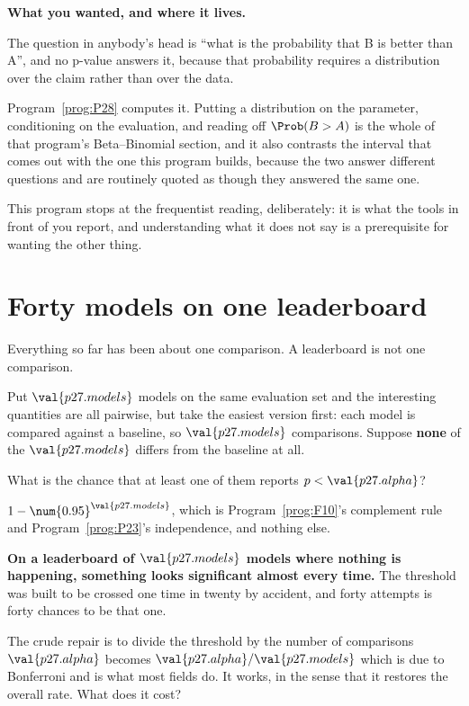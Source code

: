 \begin{fr}
\begin{rigourbox}
\textbf{What you wanted, and where it lives.}

The question in anybody's head is \enquote{what is the probability that B is
better than A}, and no p-value answers it, because that probability requires
a distribution over the claim rather than over the data.

Program~\ref{prog:P28} computes it. Putting a distribution on the parameter,
conditioning on the evaluation, and reading off $\Prob(B > A)$ is the whole
of that program's Beta--Binomial section, and it also contrasts the interval
that comes out with the one this program builds, because the two answer
different questions and are routinely quoted as though they answered the
same one.

This program stops at the frequentist reading, deliberately: it is what the
tools in front of you report, and understanding what it does not say is a
prerequisite for wanting the other thing.
\end{rigourbox}
\end{fr}

\section{Forty models on one leaderboard}
\label{sec:P27-many}

\begin{fr}
Everything so far has been about one comparison. A leaderboard is not one
comparison.

Put $\val{p27.models}$ models on the same evaluation set and the interesting
quantities are all pairwise, but take the easiest version first: each model
is compared against a baseline, so $\val{p27.models}$ comparisons. Suppose
\textbf{none} of the $\val{p27.models}$ differs from the baseline at all.

What is the chance that at least one of them reports
$p < \val{p27.alpha}$?
\dotline
\nextframe
\end{fr}

\begin{fr}

$1 - \num{0.95}^{\val{p27.models}}$, which is Program~\ref{prog:F10}'s
complement rule and Program~\ref{prog:P23}'s independence, and nothing else.

\textbf{On a leaderboard of $\val{p27.models}$ models where nothing is
happening, something looks significant almost every time.} The threshold was
built to be crossed one time in twenty by accident, and forty attempts is
forty chances to be that one.

The crude repair is to divide the threshold by the number of comparisons
\dash{} $\val{p27.alpha}$ becomes $\val{p27.alpha}/\val{p27.models}$ \dash{}
which is due to Bonferroni and is what most fields do. It works, in the sense
that it restores the overall rate. What does it cost?
\dotline
\nextframe
\end{fr}

